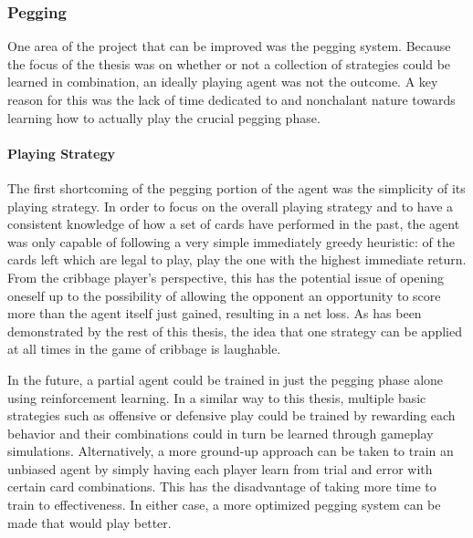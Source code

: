 
\subsubsection*{Pegging}
\label{sec:disc-future-pegging}



One area of the project that can be improved was the pegging system.
%
Because the focus of the thesis was on whether or not a collection of
strategies could be learned in combination,
an ideally playing agent was not the outcome.
%
A key reason for this was the lack of time dedicated to and nonchalant nature
towards learning how to actually play the crucial pegging phase.

\paragraph*{Playing Strategy}


The first shortcoming of the pegging portion of the agent was the simplicity
of its playing strategy.
%
In order to focus on the overall playing strategy and to have a consistent
knowledge of how a set of cards have performed in the past,
the agent was only capable of following a very simple immediately greedy 
heuristic:
of the cards left which are legal to play,
play the one with the highest immediate return.
%
From the cribbage player's perspective, this has the potential issue of
opening oneself up to the possibility of allowing the opponent an opportunity
to score more than the agent itself just gained,
resulting in a net loss.
%
As has been demonstrated by the rest of this thesis,
the idea that one strategy can be applied at all times in the game of cribbage
is laughable.

In the future,
a partial agent could be trained in just the pegging phase alone
using reinforcement learning.
%
In a similar way to this thesis,
multiple basic strategies such as offensive or defensive play
could be trained by rewarding each behavior and their combinations
could in turn be learned through gameplay simulations.
%
Alternatively,
a more ground-up approach can be taken to train an unbiased agent by simply
having each player learn from trial and error with certain card combinations.
%
This has the disadvantage of taking more time to train to effectiveness.
%
In either case,
a more optimized pegging system can be made that would play better.

